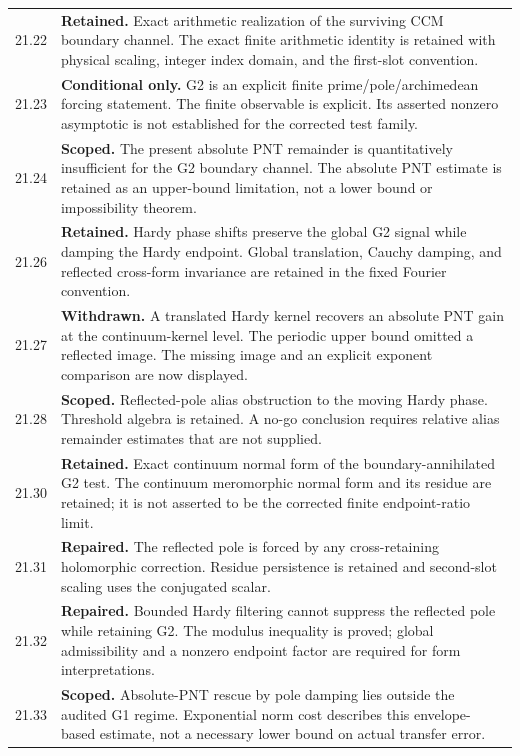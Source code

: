 \documentclass[11pt]{article}
\theoremstyle{remark}
\begin{document}
\begin{longtable}{@{}p{}p{}@{}}
21.22 & \textbf{Retained.} Exact arithmetic realization of the surviving CCM boundary channel. The exact finite arithmetic identity is retained with physical scaling, integer index domain, and the first-slot convention. \\[4pt]
21.23 & \textbf{Conditional only.} G2 is an explicit finite prime/pole/archimedean forcing statement. The finite observable is explicit. Its asserted nonzero asymptotic is not established for the corrected test family. \\[4pt]
21.24 & \textbf{Scoped.} The present absolute PNT remainder is quantitatively insufficient for the G2 boundary channel. The absolute PNT estimate is retained as an upper-bound limitation, not a lower bound or impossibility theorem. \\[4pt]
21.26 & \textbf{Retained.} Hardy phase shifts preserve the global G2 signal while damping the Hardy endpoint. Global translation, Cauchy damping, and reflected cross-form invariance are retained in the fixed Fourier convention. \\[4pt]
21.27 & \textbf{Withdrawn.} A translated Hardy kernel recovers an absolute PNT gain at the continuum-kernel level. The periodic upper bound omitted a reflected image. The missing image and an explicit exponent comparison are now displayed. \\[4pt]
21.28 & \textbf{Scoped.} Reflected-pole alias obstruction to the moving Hardy phase. Threshold algebra is retained. A no-go conclusion requires relative alias remainder estimates that are not supplied. \\[4pt]
21.30 & \textbf{Retained.} Exact continuum normal form of the boundary-annihilated G2 test. The continuum meromorphic normal form and its residue are retained; it is not asserted to be the corrected finite endpoint-ratio limit. \\[4pt]
21.31 & \textbf{Repaired.} The reflected pole is forced by any cross-retaining holomorphic correction. Residue persistence is retained and second-slot scaling uses the conjugated scalar. \\[4pt]
21.32 & \textbf{Repaired.} Bounded Hardy filtering cannot suppress the reflected pole while retaining G2. The modulus inequality is proved; global admissibility and a nonzero endpoint factor are required for form interpretations. \\[4pt]
21.33 & \textbf{Scoped.} Absolute-PNT rescue by pole damping lies outside the audited G1 regime. Exponential norm cost describes this envelope-based estimate, not a necessary lower bound on actual transfer error. \\[4pt]

\end{longtable}
\end{document}
